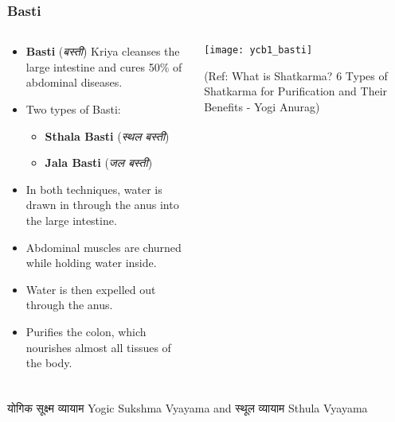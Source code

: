 \begin{frame}[fragile]\frametitle{Basti}
\begin{columns}
    \begin{column}[T]{0.5\linewidth}
      \begin{itemize}
          \item \textbf{Basti} (\textit{बस्ती}) Kriya cleanses the large intestine and cures 50\% of abdominal diseases.
          \item Two types of Basti:
            \begin{itemize}
              \item \textbf{Sthala Basti} (\textit{स्थल बस्ती})
              \item \textbf{Jala Basti} (\textit{जल बस्ती})
            \end{itemize}
          \item In both techniques, water is drawn in through the anus into the large intestine.
          \item Abdominal muscles are churned while holding water inside.
          \item Water is then expelled out through the anus.
          \item Purifies the colon, which nourishes almost all tissues of the body.
      \end{itemize}
    \end{column}
    \begin{column}[T]{0.5\linewidth}
        \begin{center}
        \texttt{[image: ycb1\_basti]}
		
		{\tiny (Ref: What is Shatkarma? 6 Types of Shatkarma for Purification and Their Benefits - Yogi Anurag)}	
        \end{center}	
    \end{column}
\end{columns}	  
\end{frame}


\begin{frame}[fragile]\frametitle{}
\begin{center}
{\Large योगिक सूक्ष्म व्यायाम  Yogic Sukshma Vyayama and स्थूल व्यायाम Sthula Vyayama}
\end{center}
\end{frame}


